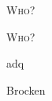 \documentclass[10pt,a4paper]{article}
\begin{document}
	\begin{titlepage}
		\centering
		{\scshape\LARGE Who? \par}
		{\scshape\LARGE Who? \par}		

		{\huge adq}

		Brocken
	\end{titlepage}
\end{document}
